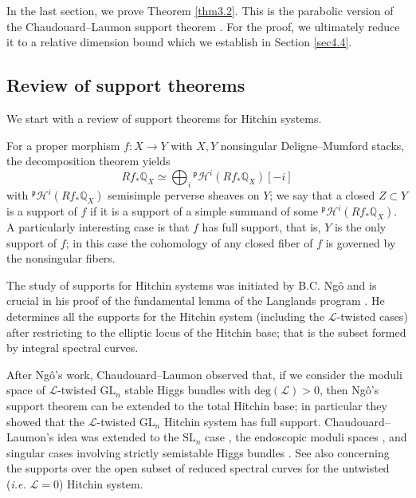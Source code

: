 \documentclass[11pt]{amsart}
\theoremstyle{plain}
\theoremstyle{definition}
\theoremstyle{remark}
\newcommand{\BQ}{{\mathbb{Q}}}
\newcommand{\CH}{{\mathcal H}}
\newcommand{\CL}{{\mathcal L}}
\begin{document}
In the last section, we prove Theorem \ref{thm3.2}. This is the parabolic version of the Chaudouard--Laumon support theorem \cite{CL}. For the proof, we ultimately reduce it to a relative dimension bound which we establish in Section \ref{sec4.4}.

\subsection{Review of support theorems}\label{Sec4.1}

We start with a review of support theorems for Hitchin systems.

For a proper morphism $f: X\to Y$ with $X,Y$ nonsingular Deligne--Mumford stacks, the decomposition theorem \cite{BBD} yields
\[
Rf_* \BQ_X \simeq \bigoplus_i {^\mathfrak{p}\CH^i(Rf_* \BQ_X)[-i]}
\]
with ${^\mathfrak{p}\CH^i}(Rf_* \BQ_X)$ semisimple perverse sheaves on $Y$; we say that a closed $Z \subset Y$ is a support of $f$ if it is a support of a simple summand of some ${^\mathfrak{p}\CH^i}(Rf_* \BQ_X)$. A particularly interesting case is that $f$ has full support, that is, $Y$ is the only support of $f$; in this case the cohomology of any closed fiber of $f$ is governed by the nonsingular fibers.

The study of supports for Hitchin systems was initiated by B.C. Ng\^o and is crucial in his proof of the fundamental lemma of the Langlands program \cite{Ngo}. He determines all the supports for the Hitchin system (including the $\CL$-twisted cases) after restricting to the elliptic locus of the Hitchin base; that is the subset formed by integral spectral curves.

After Ng\^o's work, Chaudouard--Laumon \cite{CL} observed that, if we consider the moduli space of $\CL$-twisted $\mathrm{GL}_n$ stable Higgs bundles with $\mathrm{deg}(\CL) >0$, then Ng\^o's support theorem can be extended to the total Hitchin base; in particular they showed that the $\CL$-twisted $\mathrm{GL}_n$ Hitchin system has full support. Chaudouard--Laumon's idea was extended to the $\mathrm{SL}_n$ case \cite{dC_SL}, the endoscopic moduli spaces \cite{MS}, and singular cases involving strictly semistable Higgs bundles \cite{MS2, MS3}. See also \cite{dCHM2, MM} concerning the supports over the open subset of reduced spectral curves for the untwisted (\emph{i.e.} $\CL = 0$) Hitchin system.
\end{document}
